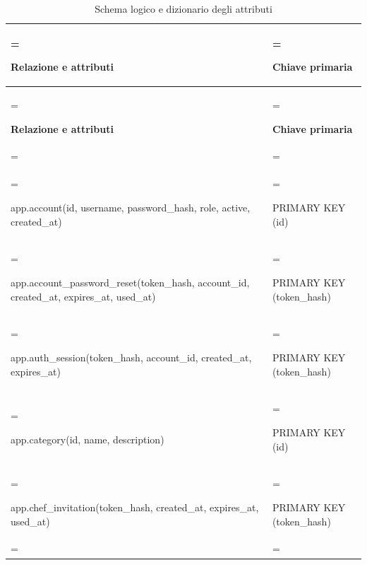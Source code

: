 \documentclass[11pt,a4paper]{article}
\begin{document}
{\small \renewcommand{\arraystretch}{1.2}

\begin{xltabular}{\linewidth}{>{\hsize\linewidth=\hsize\raggedright\arraybackslash}X>{\hsize\linewidth=\hsize\raggedright\arraybackslash}X}
\caption{Schema logico e dizionario degli attributi}\label{tab:dictionary-4}\\
\toprule

\textbf{Relazione e attributi} & \textbf{Chiave primaria}\\\midrule\endfirsthead\toprule\textbf{Relazione e attributi} & \textbf{Chiave primaria}\\\midrule\endhead
\midrule{}\\\endfoot\bottomrule\endlastfoot


{\ttfamily\small app.\allowbreak{}account(\allowbreak{}id,\allowbreak{} username,\allowbreak{} password\_\allowbreak{}hash,\allowbreak{} role,\allowbreak{} active,\allowbreak{} created\_\allowbreak{}at)} & {\ttfamily\small PRIMARY KEY (\allowbreak{}id)}\\\addlinespace[3pt]

{\ttfamily\small app.\allowbreak{}account\_\allowbreak{}password\_\allowbreak{}reset(\allowbreak{}token\_\allowbreak{}hash,\allowbreak{} account\_\allowbreak{}id,\allowbreak{} created\_\allowbreak{}at,\allowbreak{} expires\_\allowbreak{}at,\allowbreak{} used\_\allowbreak{}at)} & {\ttfamily\small PRIMARY KEY (\allowbreak{}token\_\allowbreak{}hash)}\\\addlinespace[3pt]

{\ttfamily\small app.\allowbreak{}auth\_\allowbreak{}session(\allowbreak{}token\_\allowbreak{}hash,\allowbreak{} account\_\allowbreak{}id,\allowbreak{} created\_\allowbreak{}at,\allowbreak{} expires\_\allowbreak{}at)} & {\ttfamily\small PRIMARY KEY (\allowbreak{}token\_\allowbreak{}hash)}\\\addlinespace[3pt]

{\ttfamily\small app.\allowbreak{}category(\allowbreak{}id,\allowbreak{} name,\allowbreak{} description)} & {\ttfamily\small PRIMARY KEY (\allowbreak{}id)}\\\addlinespace[3pt]

{\ttfamily\small app.\allowbreak{}chef\_\allowbreak{}invitation(\allowbreak{}token\_\allowbreak{}hash,\allowbreak{} created\_\allowbreak{}at,\allowbreak{} expires\_\allowbreak{}at,\allowbreak{} used\_\allowbreak{}at)} & {\ttfamily\small PRIMARY KEY (\allowbreak{}token\_\allowbreak{}hash)}\\\addlinespace[3pt]


\end{xltabular}}
\end{document}
